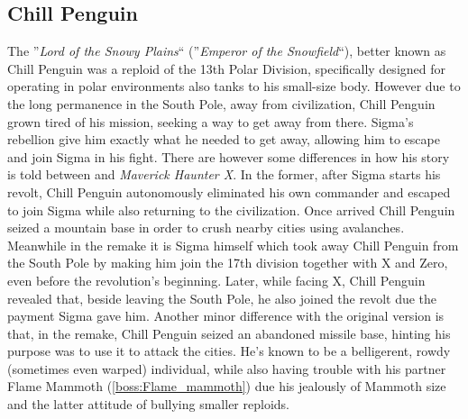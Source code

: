 \subsection{Chill Penguin}\label{boss:Chill_Penguin}
The ''\textit{Lord of the Snowy Plains}``\cite{MHX:manual} (''\textit{Emperor of the Snowfield}``\cite{wayback:X_resources}), better known as Chill Penguin was a reploid of the 13th Polar Division, specifically designed for operating in polar environments also tanks to his small-size body. However due to the long permanence in the South Pole, away from civilization, Chill Penguin grown tired of his mission, seeking a way to get away from there. Sigma's rebellion give him exactly what he needed to get away, allowing him to escape and join Sigma in his fight. There are however some differences in how his story is told between \x and \textit{Maverick Haunter X}. In the former, after Sigma starts his revolt, Chill Penguin autonomously eliminated his own commander and escaped to join Sigma while also returning to the civilization\cite{Xcoll1:Manual_X1}. Once arrived Chill Penguin seized a mountain base in order to crush nearby cities using avalanches. Meanwhile in the remake it is Sigma himself which took away Chill Penguin from the South Pole by making him join the 17th division together with X and Zero, even before the revolution's beginning\cite{MHX:manual}. Later, while facing X, Chill Penguin revealed that, beside leaving the South Pole, he also joined the revolt due the payment Sigma gave him\cite{wiki:MMX_script}. Another minor difference with the original version is that, in the remake, Chill Penguin seized an abandoned missile base, hinting his purpose was to use it to attack the cities. He's known to be a belligerent, rowdy (sometimes even warped) individual, while also having trouble with his partner Flame Mammoth (\ref{boss:Flame_mammoth}) due his jealously of Mammoth size and the latter attitude of bullying smaller reploids.

